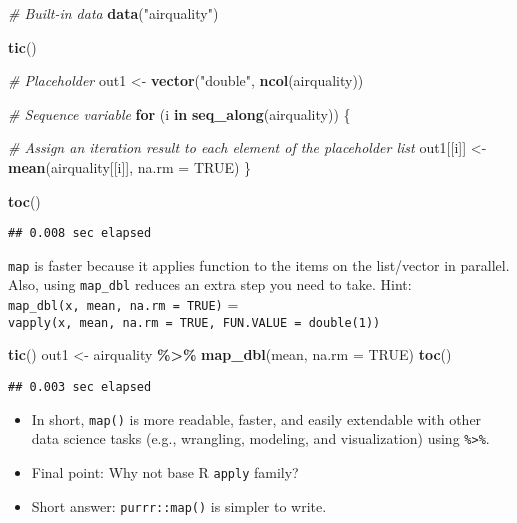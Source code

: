 \documentclass[
]{book}
\newenvironment{Shaded}{\begin{snugshade}}{\end{snugshade}}
\newcommand{\CommentTok}[1]{\textcolor[rgb]{0.56,0.35,0.01}{\textit{#1}}}
\newcommand{\ControlFlowTok}[1]{\textcolor[rgb]{0.13,0.29,0.53}{\textbf{#1}}}
\newcommand{\DataTypeTok}[1]{\textcolor[rgb]{0.13,0.29,0.53}{#1}}
\newcommand{\KeywordTok}[1]{\textcolor[rgb]{0.13,0.29,0.53}{\textbf{#1}}}
\newcommand{\NormalTok}[1]{#1}
\newcommand{\OperatorTok}[1]{\textcolor[rgb]{0.81,0.36,0.00}{\textbf{#1}}}
\newcommand{\OtherTok}[1]{\textcolor[rgb]{0.56,0.35,0.01}{#1}}
\newcommand{\StringTok}[1]{\textcolor[rgb]{0.31,0.60,0.02}{#1}}
\begin{document}
\begin{Shaded}
\begin{Highlighting}[]
\CommentTok{\# Built{-}in data}
\KeywordTok{data}\NormalTok{(}\StringTok{"airquality"}\NormalTok{)}

\KeywordTok{tic}\NormalTok{()}

\CommentTok{\# Placeholder}
\NormalTok{out1 \textless{}{-}}\StringTok{ }\KeywordTok{vector}\NormalTok{(}\StringTok{"double"}\NormalTok{, }\KeywordTok{ncol}\NormalTok{(airquality))}

\CommentTok{\# Sequence variable}
\ControlFlowTok{for}\NormalTok{ (i }\ControlFlowTok{in} \KeywordTok{seq\_along}\NormalTok{(airquality)) \{ }

  \CommentTok{\# Assign an iteration result to each element of the placeholder list }
\NormalTok{  out1[[i]] \textless{}{-}}\StringTok{ }\KeywordTok{mean}\NormalTok{(airquality[[i]], }\DataTypeTok{na.rm =} \OtherTok{TRUE}\NormalTok{)}
\NormalTok{\}}

\KeywordTok{toc}\NormalTok{()}
\end{Highlighting}
\end{Shaded}

\begin{verbatim}
## 0.008 sec elapsed
\end{verbatim}

\texttt{map} is faster because it applies function to the items on the list/vector in parallel. Also, using \texttt{map\_dbl} reduces an extra step you need to take. Hint: \texttt{map\_dbl(x,\ mean,\ na.rm\ =\ TRUE)} = \texttt{vapply(x,\ mean,\ na.rm\ =\ TRUE,\ FUN.VALUE\ =\ double(1))}

\begin{Shaded}
\begin{Highlighting}[]
\KeywordTok{tic}\NormalTok{()}
\NormalTok{out1 \textless{}{-}}\StringTok{ }\NormalTok{airquality }\OperatorTok{\%\textgreater{}\%}\StringTok{ }\KeywordTok{map\_dbl}\NormalTok{(mean, }\DataTypeTok{na.rm =} \OtherTok{TRUE}\NormalTok{)}
\KeywordTok{toc}\NormalTok{()}
\end{Highlighting}
\end{Shaded}

\begin{verbatim}
## 0.003 sec elapsed
\end{verbatim}

\begin{itemize}
\item
  In short, \texttt{map()} is more readable, faster, and easily extendable with other data science tasks (e.g., wrangling, modeling, and visualization) using \texttt{\%\textgreater{}\%}.
\item
  Final point: Why not base R \texttt{apply} family?
\item
  Short answer: \texttt{purrr::map()} is simpler to write.
\end{itemize}
\end{document}
